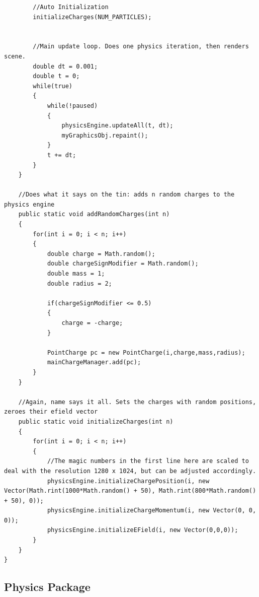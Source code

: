 \documentclass[10pt]{article}
\begin{document}
\begin{verbatim}
		//Auto Initialization
		initializeCharges(NUM_PARTICLES);


		//Main update loop. Does one physics iteration, then renders scene.
		double dt = 0.001;
		double t = 0;
		while(true)
		{
			while(!paused)
			{
				physicsEngine.updateAll(t, dt);
				myGraphicsObj.repaint();
			}
			t += dt;
		}
	}

	//Does what it says on the tin: adds n random charges to the physics engine
	public static void addRandomCharges(int n)
	{
		for(int i = 0; i < n; i++)
		{
			double charge = Math.random();
			double chargeSignModifier = Math.random();
			double mass = 1;
			double radius = 2;

			if(chargeSignModifier <= 0.5)
			{
				charge = -charge;
			}

			PointCharge pc = new PointCharge(i,charge,mass,radius);
			mainChargeManager.add(pc);
		}
	}

	//Again, name says it all. Sets the charges with random positions, zeroes their efield vector
	public static void initializeCharges(int n)
	{
		for(int i = 0; i < n; i++)
		{
			//The magic numbers in the first line here are scaled to deal with the resolution 1280 x 1024, but can be adjusted accordingly.
			physicsEngine.initializeChargePosition(i, new Vector(Math.rint(1000*Math.random() + 50), Math.rint(800*Math.random() + 50), 0));
			physicsEngine.initializeChargeMomentum(i, new Vector(0, 0, 0));
			physicsEngine.initializeEField(i, new Vector(0,0,0));
		}
	}
}

\end{verbatim}
\subsection{Physics Package}
\end{document}

